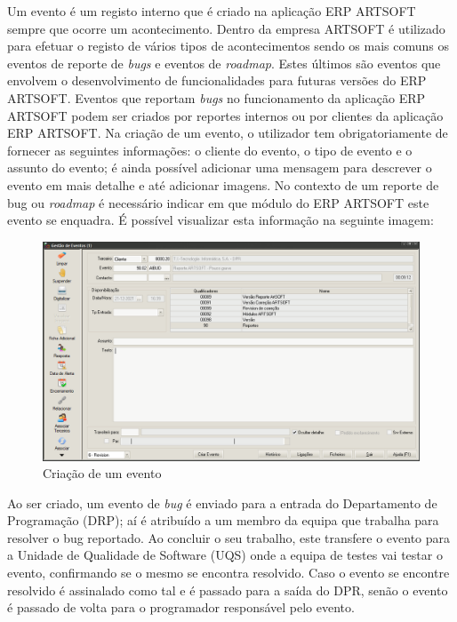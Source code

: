 \documentclass[sigplan]{acmart}
\begin{document}
Um evento é um registo interno que é criado na aplicação ERP ARTSOFT sempre que ocorre um acontecimento. Dentro da empresa ARTSOFT é utilizado para efetuar o registo de vários tipos de acontecimentos sendo os mais comuns os eventos de reporte de \textit{bugs} e eventos de \textit{roadmap}. Estes últimos são eventos que envolvem o desenvolvimento de funcionalidades para futuras versões do ERP ARTSOFT. Eventos que reportam \textit{bugs} no funcionamento da aplicação ERP ARTSOFT podem ser criados por reportes internos ou por clientes da aplicação ERP ARTSOFT. Na criação de um evento, o utilizador tem obrigatoriamente de fornecer as seguintes informações: o cliente do evento, o tipo de evento e o assunto do evento; é ainda possível adicionar uma mensagem para descrever o evento em mais detalhe e até adicionar imagens. No contexto de um reporte de bug ou \textit{roadmap} é necessário indicar em que módulo do ERP ARTSOFT este evento se enquadra. É possível visualizar esta informação na seguinte imagem:
\FloatBarrier
\begin{figure}[htbp]
	\centerline{\includegraphics[width=\linewidth]{figures/evento_criacao.png}}
	\caption{Criação de um evento}
	\label{fig1}
\end{figure}
\FloatBarrier
Ao ser criado, um evento de \textit{bug} é enviado para a entrada do Departamento de Programação (DRP); aí é atribuído a um membro da equipa que trabalha para resolver o bug reportado. Ao concluir o seu trabalho, este transfere o evento para a Unidade de Qualidade de Software (UQS) onde a equipa de testes vai testar o evento, confirmando se o mesmo se encontra resolvido. Caso o evento se encontre resolvido é assinalado como tal e é passado para a saída do DPR, senão o evento é passado de volta para o programador responsável pelo evento.
\end{document}
